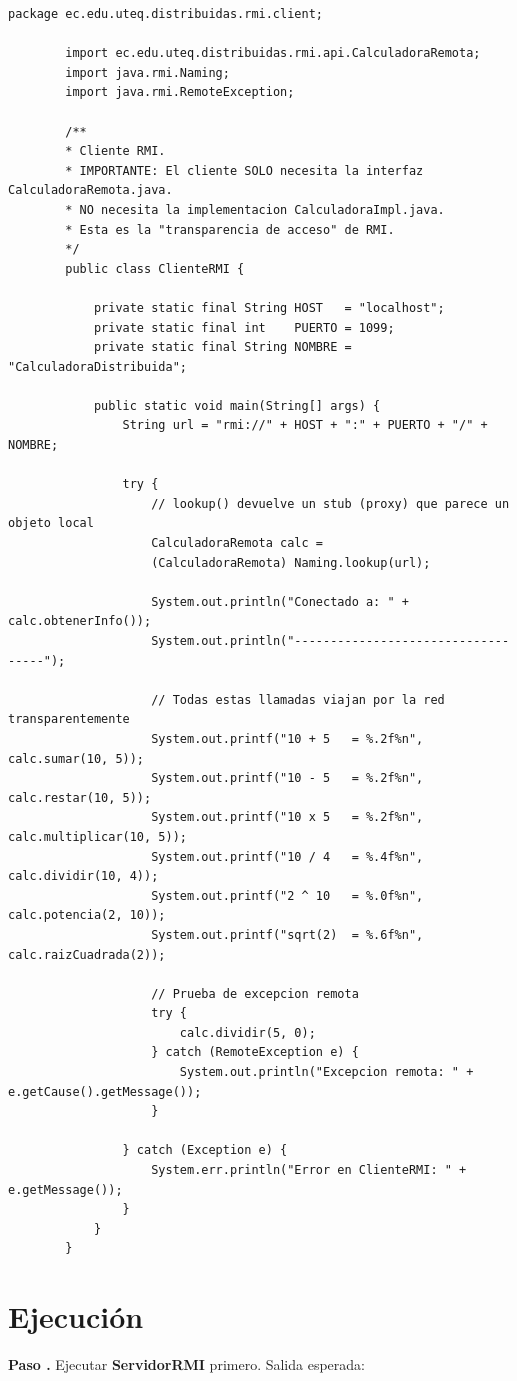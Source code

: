 \documentclass[12pt, a4paper, openany]{book}
\newcounter{paso}[section]
\newcommand{\paso}[1]{%
	\stepcounter{paso}%
	\medskip\noindent
	\begin{tcolorbox}[enhanced, colback=white, colframe=practiceBlue,
		boxrule=0.8pt, arc=3pt, left=6pt, right=6pt, top=4pt, bottom=4pt,
		before upper={\noindent}]
		\textcolor{practiceBlue}{\textbf{Paso \arabic{paso}.}} #1
	\end{tcolorbox}%
}
\begin{document}
	\begin{lstlisting}[style=JavaStyle, caption={ClienteRMI.java --- Cliente que invoca métodos remotos}]
		package ec.edu.uteq.distribuidas.rmi.client;
		
		import ec.edu.uteq.distribuidas.rmi.api.CalculadoraRemota;
		import java.rmi.Naming;
		import java.rmi.RemoteException;
		
		/**
		* Cliente RMI.
		* IMPORTANTE: El cliente SOLO necesita la interfaz CalculadoraRemota.java.
		* NO necesita la implementacion CalculadoraImpl.java.
		* Esta es la "transparencia de acceso" de RMI.
		*/
		public class ClienteRMI {
			
			private static final String HOST   = "localhost";
			private static final int    PUERTO = 1099;
			private static final String NOMBRE = "CalculadoraDistribuida";
			
			public static void main(String[] args) {
				String url = "rmi://" + HOST + ":" + PUERTO + "/" + NOMBRE;
				
				try {
					// lookup() devuelve un stub (proxy) que parece un objeto local
					CalculadoraRemota calc =
					(CalculadoraRemota) Naming.lookup(url);
					
					System.out.println("Conectado a: " + calc.obtenerInfo());
					System.out.println("-----------------------------------");
					
					// Todas estas llamadas viajan por la red transparentemente
					System.out.printf("10 + 5   = %.2f%n", calc.sumar(10, 5));
					System.out.printf("10 - 5   = %.2f%n", calc.restar(10, 5));
					System.out.printf("10 x 5   = %.2f%n", calc.multiplicar(10, 5));
					System.out.printf("10 / 4   = %.4f%n", calc.dividir(10, 4));
					System.out.printf("2 ^ 10   = %.0f%n", calc.potencia(2, 10));
					System.out.printf("sqrt(2)  = %.6f%n", calc.raizCuadrada(2));
					
					// Prueba de excepcion remota
					try {
						calc.dividir(5, 0);
					} catch (RemoteException e) {
						System.out.println("Excepcion remota: " + e.getCause().getMessage());
					}
					
				} catch (Exception e) {
					System.err.println("Error en ClienteRMI: " + e.getMessage());
				}
			}
		}
	\end{lstlisting}
	
	\section{Ejecución}
	
	\paso{Ejecutar \textbf{ServidorRMI} primero. Salida esperada:}
	
\end{document}
